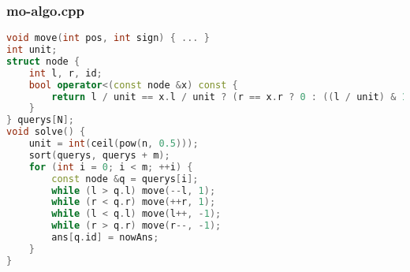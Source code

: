 \documentclass[9pt, a4paper, oneside]{book}
\begin{document}
\subsubsection{mo-algo.cpp}
\begin{lstlisting}[language={C++}]
void move(int pos, int sign) { ... }
int unit;
struct node {
    int l, r, id;
    bool operator<(const node &x) const {
        return l / unit == x.l / unit ? (r == x.r ? 0 : ((l / unit) & 1) ^ (r < x.r)) : l < x.l;
    }
} querys[N];
void solve() {
    unit = int(ceil(pow(n, 0.5)));
    sort(querys, querys + m);
    for (int i = 0; i < m; ++i) {
        const node &q = querys[i];
        while (l > q.l) move(--l, 1);
        while (r < q.r) move(++r, 1);
        while (l < q.l) move(l++, -1);
        while (r > q.r) move(r--, -1);
        ans[q.id] = nowAns;
    }
}\end{lstlisting}
\end{document}
